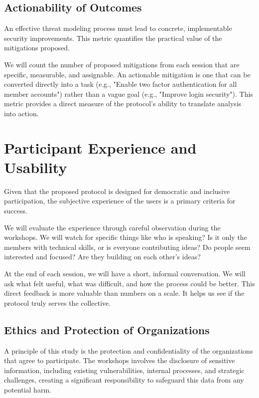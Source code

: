 \subsection{Actionability of Outcomes}
\label{subsec:actionability_of_outcomes}

An effective threat modeling process must lead to concrete, implementable
security improvements. This metric quantifies the practical value of the
mitigations proposed.

We will count the number of proposed mitigations from each session that are specific,
measurable, and assignable. An actionable mitigation is one that can be converted directly
into a task (e.g., "Enable two factor authentication for all member accounts") rather
than a vague goal (e.g., "Improve login security"). This metric provides a
direct measure of the protocol's ability to translate analysis into action.

\section{Participant Experience and Usability}
\label{sec:participant_experience}

Given that the proposed protocol is designed for democratic and inclusive participation,
the subjective experience of the users is a primary criteria for
success.

We will evaluate the experience through careful observation during the workshops. We
will watch for specific things like who is speaking? Is it only the members with technical
skills, or is everyone contributing ideas? Do people seem interested and focused? Are they
building on each other's ideas? 

At the end of each session, we will have a short, informal
conversation. We will ask what felt useful, what was difficult, and how the
process could be better. This direct feedback is more valuable than numbers
on a scale. It helps us see if the protocol truly serves the collective.

\subsection{Ethics and Protection of Organizations}
\label{subsec:ethics_protection}

A principle of this study is the protection and confidentiality
of the organizations that agree to participate. The workshops
involves the disclosure of sensitive information, including existing vulnerabilities,
internal processes, and strategic challenges, creating a significant responsibility to
safeguard this data from any potential harm.

